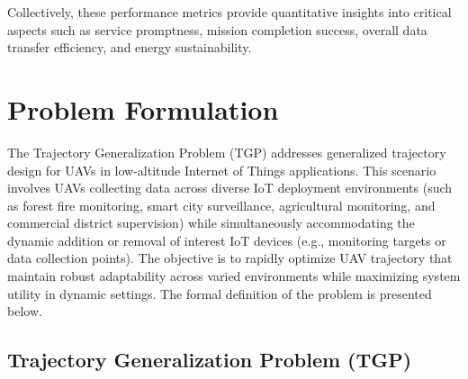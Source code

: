 \documentclass[10pt,conference,letterpaper]{IEEEtran}
\begin{document}


Collectively, these performance metrics provide quantitative insights into critical aspects such as service promptness, mission completion success, overall data transfer efficiency, and energy sustainability. 

\section{Problem Formulation}
\label{sec:problem_formulation}
The Trajectory Generalization Problem (TGP) addresses generalized trajectory design for UAVs in low-altitude Internet of Things applications. This scenario involves UAVs collecting data across diverse IoT deployment environments (such as forest fire monitoring, smart city surveillance, agricultural monitoring, and commercial district supervision) while simultaneously accommodating the dynamic addition or removal of interest IoT devices (e.g., monitoring targets or data collection points). The objective is to rapidly optimize UAV trajectory that maintain robust adaptability across varied environments while maximizing system utility in dynamic settings. The formal definition of the problem is presented below.

\subsection{Trajectory Generalization Problem (TGP)}
\end{document}
